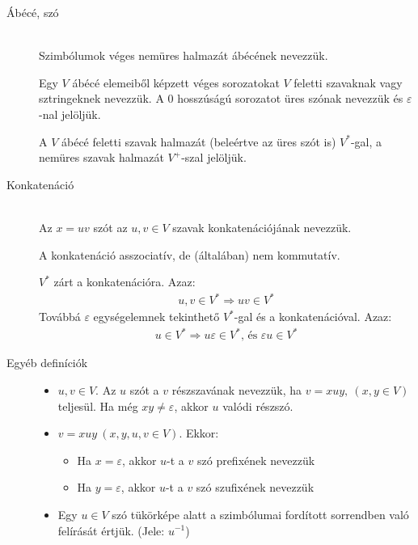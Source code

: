 \documentclass[margin=0px]{article}
\begin{document}
\begin{description}
    \item[Ábécé, szó] \hfill \\
        Szimbólumok véges nemüres halmazát ábécének nevezzük.

        Egy $V$ ábécé elemeiből képzett véges sorozatokat $V$ feletti szavaknak vagy sztringeknek nevezzük. A 0 hosszúságú sorozatot üres szónak nevezzük és
        $\varepsilon$-nal jelöljük.

        A $V$ ábécé feletti szavak halmazát (beleértve az üres szót is) $V^*$-gal, a nemüres szavak halmazát $V^+$-szal jelöljük.

    \item[Konkatenáció] \hfill \\
        Az $ x = uv$ szót az $u,v \in V$ szavak konkatenációjának nevezzük.

        A konkatenáció asszociatív, de (általában) nem kommutatív.

        $V^*$ zárt a konkatenációra. Azaz:
        \begin{align*}
            u,v \in V^* \Rightarrow uv \in V^*
        \end{align*}
        Továbbá $\varepsilon$ egységelemnek tekinthető $V^*$-gal és a konkatenációval. Azaz:
        \begin{align*}
            u \in V^* \Rightarrow u\varepsilon \in V^* \textrm{, és }\varepsilon u \in V^*
        \end{align*}
    \item[Egyéb definíciók] \hfill
        \begin{itemize}
            \item $u,v \in V$. Az $u$ szót a $v$ részszavának nevezzük, ha $ v = xuy , \ (x,y \in V)$ teljesül. Ha még $xy\neq\varepsilon$, akkor $u$ valódi részszó.

            \item $ v  = xuy \ (x,y,u,v \in V)$. Ekkor:
                  \begin{itemize}
                      \item Ha $x=\varepsilon$, akkor $u$-t a $v$ szó prefixének nevezzük
                      \item Ha $y=\varepsilon$, akkor $u$-t a $v$ szó szufixének nevezzük
                  \end{itemize}

            \item Egy $u\in V$ szó tükörképe alatt a szimbólumai fordított sorrendben való felírását értjük. (Jele: $u^{-1}$)
        \end{itemize}
\end{description}
\end{document}
